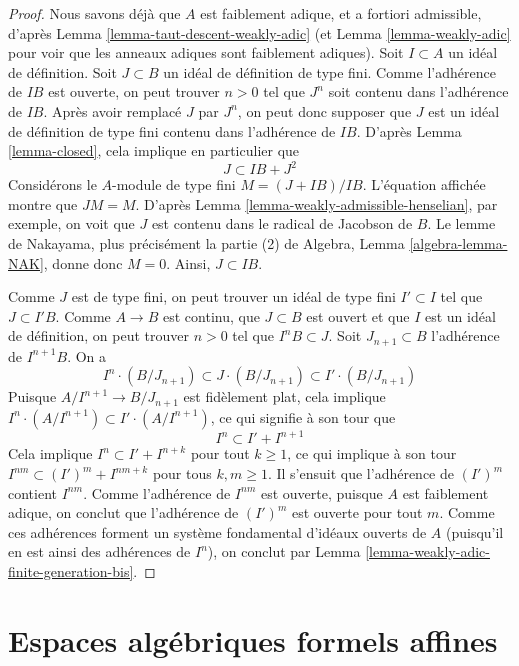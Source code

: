 \begin{proof}
Nous savons déjà que $A$ est faiblement adique, et a fortiori admissible, d'après
Lemma \ref{lemma-taut-descent-weakly-adic}
(et Lemma \ref{lemma-weakly-adic} pour voir que les anneaux adiques sont faiblement adiques).
Soit $I \subset A$ un idéal de définition.
Soit $J \subset B$ un idéal de définition de type fini.
Comme l'adhérence de $IB$ est ouverte, on peut trouver $n > 0$ tel que
$J^n$ soit contenu dans l'adhérence de $IB$. Après avoir remplacé $J$
par $J^n$, on peut donc supposer que $J$ est un idéal de définition
de type fini contenu dans l'adhérence de $IB$. D'après Lemma \ref{lemma-closed},
cela implique en particulier que
$$
J \subset IB + J^2
$$
Considérons le $A$-module de type fini $M = (J + IB)/IB$.
L'équation affichée montre que $JM = M$.
D'après Lemma \ref{lemma-weakly-admissible-henselian}, par exemple,
on voit que $J$ est contenu dans le radical de Jacobson de $B$.
Le lemme de Nakayama, plus précisément la partie (2) de
Algebra, Lemma \ref{algebra-lemma-NAK}, donne donc $M = 0$.
Ainsi, $J \subset IB$.

\medskip\noindent
Comme $J$ est de type fini, on peut trouver un idéal de type fini
$I' \subset I$ tel que $J \subset I'B$.
Comme $A \to B$ est continu, que $J \subset B$ est ouvert et que
$I$ est un idéal de définition, on peut trouver $n > 0$ tel que
$I^nB \subset J$. Soit $J_{n + 1} \subset B$ l'adhérence de
$I^{n + 1}B$.
On a
$$
I^n \cdot (B/J_{n + 1}) \subset J \cdot (B/J_{n + 1}) \subset
I' \cdot (B/J_{n + 1})
$$
Puisque $A/I^{n + 1} \to B/J_{n + 1}$ est fidèlement plat, cela
implique $I^n \cdot (A/I^{n + 1}) \subset I' \cdot (A/I^{n + 1})$,
ce qui signifie à son tour que
$$
I^n \subset I' + I^{n + 1}
$$
Cela implique $I^n \subset I'  + I^{n + k}$ pour tout $k \geq 1$,
ce qui implique à son tour $I^{nm} \subset (I')^m + I^{nm + k}$
pour tous $k, m \geq 1$. Il s'ensuit que l'adhérence de
$(I')^m$ contient $I^{nm}$. Comme l'adhérence de $I^{nm}$ est ouverte,
puisque $A$ est faiblement adique,
on conclut que l'adhérence de $(I')^m$ est ouverte pour tout $m$.
Comme ces adhérences forment un système fondamental d'idéaux ouverts
de $A$ (puisqu'il en est ainsi des adhérences de $I^n$),
on conclut par Lemma \ref{lemma-weakly-adic-finite-generation-bis}.
\end{proof}









\section{Espaces algébriques formels affines}
\label{section-affine-formal-algebraic-spaces}

